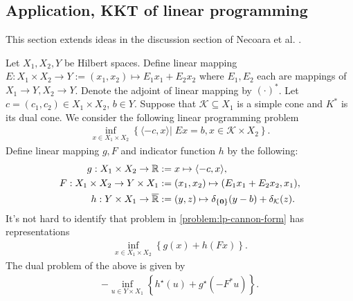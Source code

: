 \documentclass[12pt]{report}
\begin{document}
        \subsection{Application, KKT of linear programming}
            This section extends ideas in the discussion section of Necoara et al. \cite{necoara_linear_2019}. 
            \par
            Let $X_1, X_2, Y$ be Hilbert spaces. 
            Define linear mapping $E:X_1 \times X_2 \rightarrow Y := (x_1, x_2)\mapsto E_1 x_1 + E_2 x_2$ where $E_1, E_2$ each are mappings of $X_1 \rightarrow Y, X_2 \rightarrow Y$. 
            Denote the adjoint of linear mapping by $(\cdot)^*$. 
            Let $c = (c_1, c_2) \in X_1 \times X_2$, $b \in Y$. 
            Suppose that $\mathcal K \subseteq X_1$ is a simple cone and $K^*$ is its dual cone. 
            We consider the following linear programming problem 
            \begin{align}\label{problem:lp-cannon-form}
                \inf_{x \in X_1\times X_2}\left\lbrace
                    \langle - c, x\rangle
                    \left| \;
                        Ex = b, x \in \mathcal K \times X_2
                    \right.
                \right\rbrace. 
            \end{align}
            Define linear mapping $g, F$ and indicator function $h$ by the following: 
            \begin{align*}
                g:X_1\times X_2 \rightarrow \mathbb R 
                    &:= x \mapsto \langle - c, x\rangle, 
                \\
                F: X_1\times X_2 \rightarrow Y \times X_1 
                    &:= (x_1, x_2) \mapsto (E_1x_1 + E_2 x_2, x_1),
                \\
                h: Y \times X_1 \rightarrow \overline {\mathbb R} &:= 
                    (y, z) \mapsto \delta_{\{\mathbf 0\}}(y - b) + \delta_{\mathcal K}(z). 
            \end{align*}
            It's not hard to identify that problem in \eqref{problem:lp-cannon-form} has representations 
            \begin{align*}
                \inf_{x \in X_1\times X_2}
                \left\lbrace
                    g(x) + h(Fx)
                \right\rbrace. 
            \end{align*}
            The dual problem of the above is given by
            \begin{align*}
                -\inf_{u \in Y\times X_1}
                \left\lbrace
                    h^\star(u) + g^\star(-F^* u)
                \right\rbrace. 
            \end{align*}
\end{document}
